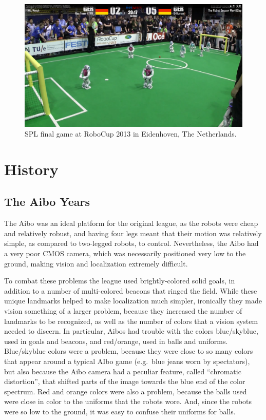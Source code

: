 \documentclass{llncs}
\begin{document}
\begin{figure}[t]
\centerline{
\includegraphics[width=1.0\columnwidth]{"spl2013"}
}
  \caption{SPL final game at RoboCup 2013 in Eidenhoven, The Netherlands.~\cite{botsport}}
  \label{spl2013}
\end{figure} 

\section{History}

\subsection{The Aibo Years}

The Aibo was
an ideal platform for the original league, as the robots were cheap and relatively robust,
and having four legs meant that their motion was relatively simple, as compared
to two-legged robots, to control. Nevertheless, the Aibo had a very poor CMOS camera, which was necessarily positioned very low to the ground, making vision and localization extremely
difficult. 

To combat these problems the league used brightly-colored solid goals, in addition
to a number of multi-colored beacons that ringed the field. While these unique
landmarks helped to make localization much simpler, ironically they made
vision something of a larger problem, because they increased the number of landmarks
to be recognized, as well as the number of colors that a vision system needed to
discern. In particular, Aibos had trouble with the colors blue/skyblue, used in
goals and beacons, and red/orange, used in balls and uniforms. Blue/skyblue colors
were a problem, because they were close to so many colors that appear
around a typical AIbo game (e.g.~blue jeans worn by spectators), but also because
the Aibo camera had a peculiar feature, called ``chromatic distortion'', that
shifted parts of the image towards the blue end of the color spectrum. Red
and orange colors were also a problem, because the balls used were close in color to the
uniforms that the robots wore. And, since the robots were so low to the ground, it
was easy to confuse their uniforms for balls.
\end{document}
